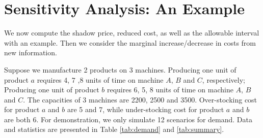\documentclass[a4paper,11pt]{article}
\begin{document}
\section{Sensitivity Analysis: An Example}
\label{se:sensitivity}

We now compute the shadow price, reduced cost, as well as the allowable interval with an example. Then we consider the marginal increase/decrease in costs from new information.

\begin{table}[h]
\caption{Demand Realisations: Example}
\label{tab:demand}
\centering
{}
\end{table}

\begin{table}[h]
\caption{Demand Realisations: Statistical Summary}
\label{tab:summary}
\centering
{}
\end{table}

Suppose we manufacture 2 products on 3 machines. Producing one unit of product $a$ requires 4, 7 ,8 units of time on machine $A$, $B$ and $C$, respectively; Producing one unit of product $b$ requires 6, 5, 8 units of time on machine $A$, $B$ and $C$. The capacities of 3 machines are 2200, 2500 and 3500. Over-stocking cost for product $a$ and $b$ are 5 and 7, while under-stocking cost for product $a$ and $b$ are both 6. For demonstration, we only simulate 12 scenarios for demand. Data and statistics are presented in Table \ref{tab:demand} and \ref{tab:summary}.
\end{document}
